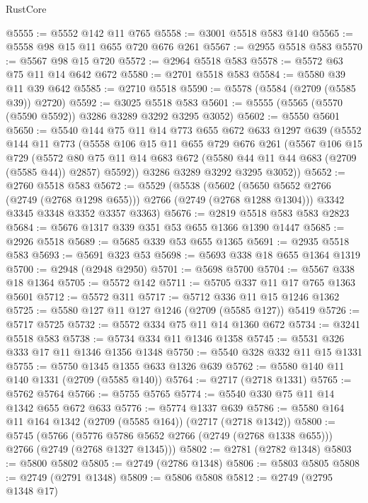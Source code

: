 \begin{lexlean}{RustCore}
\begin{coremodule}
@5555 := @5552 @142 @11 @765
@5558 := @3001 @5518 @583 @140
@5565 := @5558 @98 @15 @11 @655 @720 @676 @261
@5567 := @2955 @5518 @583
@5570 := @5567 @98 @15 @720
@5572 := @2964 @5518 @583
@5578 := @5572 @63 @75 @11 @14 @642 @672
@5580 := @2701 @5518 @583
@5584 := @5580 @39 @11 @39 @642
@5585 := @2710 @5518
@5590 := @5578 (@5584 (@2709 (@5585 @39)) @2720)
@5592 := @3025 @5518 @583
@5601 := @5555 (@5565 (@5570 (@5590 @5592)) @3286 @3289 @3292 @3295 @3052)
@5602 := @5550 @5601
@5650 := @5540
    @144
    @75
    @11
    @14
    @773
    @655
    @672
    @633
    @1297
    @639
    (@5552
      @144
      @11
      @773
      (@5558
        @106
        @15
        @11
        @655
        @729
        @676
        @261
        (@5567
          @106
          @15
          @729
          (@5572
            @80
            @75
            @11
            @14
            @683
            @672
            (@5580 @44 @11 @44 @683 (@2709 (@5585 @44)) @2857)
            @5592))
        @3286
        @3289
        @3292
        @3295
        @3052))
@5652 := @2760 @5518 @583
@5672 := @5529
    (@5538
      (@5602 (@5650 @5652 @2766 (@2749 (@2768 @1298 @655))) @2766 (@2749 (@2768 @1288 @1304)))
      @3342
      @3345
      @3348
      @3352
      @3357
      @3363)
@5676 := @2819 @5518 @583 @583 @2823
@5684 := @5676 @1317 @339 @351 @53 @655 @1366 @1390 @1447
@5685 := @2926 @5518
@5689 := @5685 @339 @53 @655 @1365
@5691 := @2935 @5518 @583
@5693 := @5691 @323 @53
@5698 := @5693 @338 @18 @655 @1364 @1319
@5700 := @2948 (@2948 @2950)
@5701 := @5698 @5700
@5704 := @5567 @338 @18 @1364
@5705 := @5572 @142
@5711 := @5705 @337 @11 @17 @765 @1363 @5601
@5712 := @5572 @311
@5717 := @5712 @336 @11 @15 @1246 @1362
@5725 := @5580 @127 @11 @127 @1246 (@2709 (@5585 @127)) @5419
@5726 := @5717 @5725
@5732 := @5572 @334 @75 @11 @14 @1360 @672
@5734 := @3241 @5518 @583
@5738 := @5734 @334 @11 @1346 @1358
@5745 := @5531 @326 @333 @17 @11 @1346 @1356 @1348
@5750 := @5540 @328 @332 @11 @15 @1331
@5755 := @5750 @1345 @1355 @633 @1326 @639
@5762 := @5580 @140 @11 @140 @1331 (@2709 (@5585 @140))
@5764 := @2717 (@2718 @1331)
@5765 := @5762 @5764
@5766 := @5755 @5765
@5774 := @5540 @330 @75 @11 @14 @1342 @655 @672 @633
@5776 := @5774 @1337 @639
@5786 := @5580 @164 @11 @164 @1342 (@2709 (@5585 @164)) (@2717 (@2718 @1342))
@5800 := @5745
    (@5766 (@5776 @5786 @5652 @2766 (@2749 (@2768 @1338 @655))) @2766 (@2749 (@2768 @1327 @1345)))
@5802 := @2781 (@2782 @1348)
@5803 := @5800 @5802
@5805 := @2749 (@2786 @1348)
@5806 := @5803 @5805
@5808 := @2749 (@2791 @1348)
@5809 := @5806 @5808
@5812 := @2749 (@2795 @1348 @17)

\end{coremodule}
\end{lexlean}
